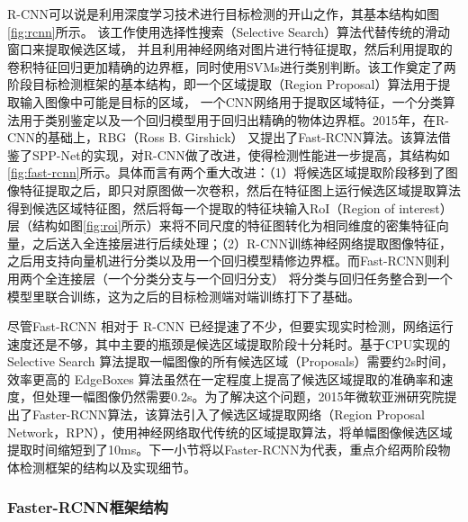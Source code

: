 R-CNN可以说是利用深度学习技术进行目标检测的开山之作，其基本结构如图\ref{fig:rcnn}所示。 该工作使用选择性搜索（Selective Search）算法\cite{UijlingsSelective}代替传统的滑动窗口来提取候选区域， 并且利用神经网络对图片进行特征提取，然后利用提取的卷积特征回归更加精确的边界框，同时使用SVMs进行类别判断。该工作奠定了两阶段目标检测框架的基本结构，即一个区域提取（Region Proposal）算法用于提取输入图像中可能是目标的区域， 一个CNN网络用于提取区域特征，一个分类算法用于类别鉴定以及一个回归模型用于回归出精确的物体边界框。2015年，在R-CNN的基础上，RBG（Ross B. Girshick） 又提出了Fast-RCNN算法。该算法借鉴了SPP-Net\cite{7005506}的实现，对R-CNN做了改进，使得检测性能进一步提高，其结构如 \figurename \, \ref{fig:fast-rcnn}所示。具体而言有两个重大改进：（1）将候选区域提取阶段移到了图像特征提取之后，即只对原图做一次卷积，然后在特征图上运行候选区域提取算法得到候选区域特征图，然后将每一个提取的特征块输入RoI（Region of interest）层（结构如图\ref{fig:roi}所示）来将不同尺度的特征图转化为相同维度的密集特征向量，之后送入全连接层进行后续处理；（2）R-CNN训练神经网络提取图像特征，之后用支持向量机进行分类以及用一个回归模型精修边界框。而Fast-RCNN则利用两个全连接层（一个分类分支与一个回归分支） 将分类与回归任务整合到一个模型里联合训练，这为之后的目标检测端对端训练打下了基础。



尽管Fast-RCNN 相对于 R-CNN 已经提速了不少，但要实现实时检测，网络运行速度还是不够，其中主要的瓶颈是候选区域提取阶段十分耗时。基于CPU实现的 Selective Search 算法提取一幅图像的所有候选区域（Proposals）需要约2s时间，效率更高的 EdgeBoxes\cite{Zitnick2014Edge} 算法虽然在一定程度上提高了候选区域提取的准确率和速度，但处理一幅图像仍然需要0.2s。为了解决这个问题，2015年微软亚洲研究院提出了Faster-RCNN算法，该算法引入了候选区域提取网络（Region Proposal Network，RPN），使用神经网络取代传统的区域提取算法，将单幅图像候选区域提取时间缩短到了10ms。下一小节将以Faster-RCNN为代表，重点介绍两阶段物体检测框架的结构以及实现细节。

\subsubsection{Faster-RCNN框架结构}



